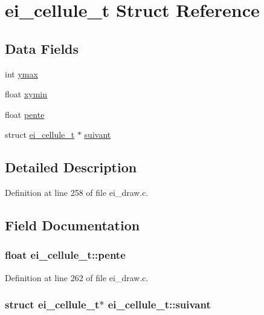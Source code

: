 \hypertarget{structei__cellule__t}{\section{ei\-\_\-cellule\-\_\-t Struct Reference}
\label{structei__cellule__t}
}
\subsection*{Data Fields}
\begin{DoxyCompactItemize}
\item 
int \hyperlink{structei__cellule__t_ac8f000cde6f76158c7360bcac0345ba3}{ymax}
\item 
float \hyperlink{structei__cellule__t_a761ea1a88e22989260c847ce0a123fb6}{xymin}
\item 
float \hyperlink{structei__cellule__t_acba2e9c7b765f2326a839d0d349149bb}{pente}
\item 
struct \hyperlink{structei__cellule__t}{ei\-\_\-cellule\-\_\-t} $\ast$ \hyperlink{structei__cellule__t_a7ec546f9430221d55dc44ffd340893d1}{suivant}
\end{DoxyCompactItemize}


\subsection{Detailed Description}


Definition at line 258 of file ei\-\_\-draw.\-c.



\subsection{Field Documentation}
\hypertarget{structei__cellule__t_acba2e9c7b765f2326a839d0d349149bb}{
\subsubsection[{pente}]{\setlength{\rightskip}{0pt plus 5cm}float ei\-\_\-cellule\-\_\-t\-::pente}}\label{structei__cellule__t_acba2e9c7b765f2326a839d0d349149bb}


Definition at line 262 of file ei\-\_\-draw.\-c.

\hypertarget{structei__cellule__t_a7ec546f9430221d55dc44ffd340893d1}{
\subsubsection[{suivant}]{\setlength{\rightskip}{0pt plus 5cm}struct {\bf ei\-\_\-cellule\-\_\-t}$\ast$ ei\-\_\-cellule\-\_\-t\-::suivant}}\label{structei__cellule__t_a7ec546f9430221d55dc44ffd340893d1}


